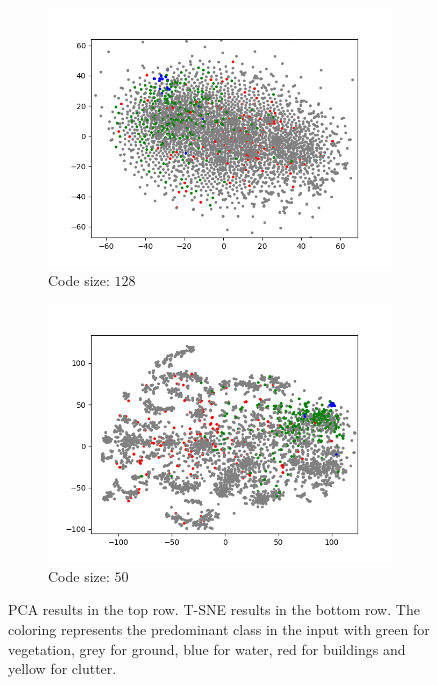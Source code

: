 \begin{figure}[H]
\begin{subfigure}{.25\textwidth}
        \includegraphics[width=\textwidth]{images/figures/experiments_latent/pooling_dim1024_classes.png}   
        \caption{Code size: $128$}
    \end{subfigure}%
    \begin{subfigure}{.25\textwidth}
        \centering
        \includegraphics[width=\textwidth]{images/figures/experiments_latent/pooling_dim50_classes.png}
        \caption{Code size: $50$}
    \end{subfigure}
    \caption{ PCA results in the top row. 
    T-SNE results in the bottom row. 
    The coloring represents the predominant class in the input with green for vegetation, 
    grey for ground, blue for water, red for buildings and yellow for clutter.}
\end{figure} \label{figure_classes_pooling}

